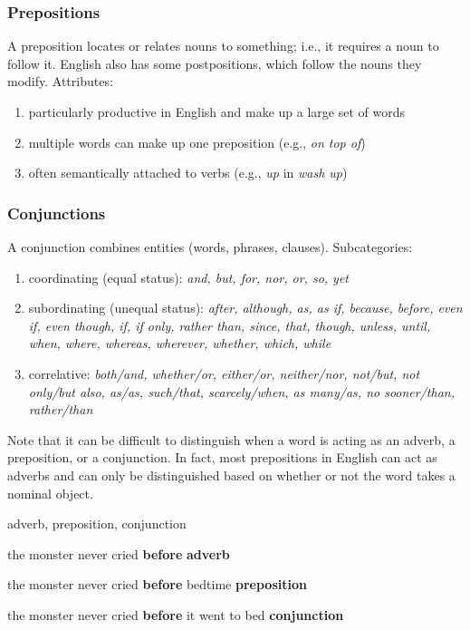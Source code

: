 \documentclass[12pt]{article}
\begin{document}
\subsubsection{Prepositions}
A preposition locates or relates nouns to something; i.e., it requires a noun to follow it. English also has some postpositions, which follow the nouns they modify. Attributes:
\begin{enumerate}
    \item particularly productive in English and make up a large set of words
    \item multiple words can make up one preposition (e.g., \textit{on top of})
    \item often semantically attached to verbs (e.g., \textit{up} in \textit{wash up})
\end{enumerate}

\subsubsection{Conjunctions}
A conjunction combines entities (words, phrases, clauses). Subcategories:
\begin{enumerate}
\item coordinating (equal status): \textit{and, but, for, nor, or, so, yet}
\item subordinating (unequal status): \textit{after, although, as, as if, because, before, even if, even though, if, if only, rather than, since, that, though, unless, until, when, where, whereas, wherever, whether, which, while}
\item correlative: \textit{both/and, whether/or, either/or, neither/nor, not/but, not only/but also, as/as, such/that, scarcely/when, as many/as, no sooner/than, rather/than}
\end{enumerate}

\noindent Note that it can be difficult to distinguish when a word is acting as an adverb, a preposition, or a conjunction. In fact, most prepositions in English can act as adverbs and can only be distinguished based on whether or not the word takes a nominal object.

\begin{exe}
\item adverb, preposition, conjunction
    \begin{xlist}
    \item the monster never cried \textbf{before} \hfill \textbf{adverb}
    \item the monster never cried \textbf{before} bedtime \hfill \textbf{preposition}
    \item the monster never cried \textbf{before} it went to bed \hfill \textbf{conjunction}
    \end{xlist}
\end{exe}
\end{document}

